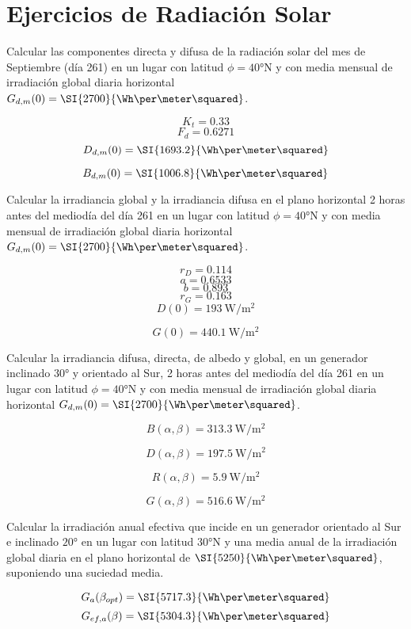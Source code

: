 \chapter{Ejercicios de Radiación Solar}



Calcular las componentes directa y difusa de la radiación solar del
mes de Septiembre (día 261) en un lugar con latitud $\phi=\ang{40}\mathrm{N}$
y con media mensual de irradiación global diaria horizontal $G_{d,m}(0)=\SI{2700}{\Wh\per\meter\squared}$.

\[
K_{t}=0.33\]
\[
F_{d}=0.6271\]
\[
D_{d,m}(0)=\SI{1693.2}{\Wh\per\meter\squared}\]


\[
B_{d,m}(0)=\SI{1006.8}{\Wh\per\meter\squared}\]


Calcular la irradiancia global y la irradiancia difusa en el plano
horizontal 2 horas antes del mediodía del día 261 en un lugar con
latitud $\phi=\ang{40}\mathrm{N}$ y con media mensual de irradiación
global diaria horizontal $G_{d,m}(0)=\SI{2700}{\Wh\per\meter\squared}$.

\[
r_{D}=0.114\]
\[
a=0.6533\]
\[
b=0.893\]
\[
r_{G}=0.163\]
\[
D(0)=\SI{193}{\watt\per\meter\squared}\]


\[
G(0)=\SI{440.1}{\watt\per\meter\squared}\]


Calcular la irradiancia difusa, directa, de albedo y global, en un
generador inclinado $\ang{30}$ y orientado al Sur, 2 horas antes
del mediodía del día 261 en un lugar con latitud $\phi=\ang{40}\mathrm{N}$
y con media mensual de irradiación global diaria horizontal $G_{d,m}(0)=\SI{2700}{\Wh\per\meter\squared}$.

\[
B(\alpha,\beta)=\SI{313.3}{\watt\per\meter\squared}\]


\[
D(\alpha,\beta)=\SI{197.5}{\watt\per\meter\squared}\]


\[
R(\alpha,\beta)=\SI{5.9}{\watt\per\meter\squared}\]


\[
G(\alpha,\beta)=\SI{516.6}{\watt\per\meter\squared}\]


Calcular la irradiación anual efectiva que incide en un generador
orientado al Sur e inclinado $\ang{20}$ en un lugar con latitud $\ang{30}\mathrm{N}$
y una media anual de la irradiación global diaria en el plano horizontal
de $\SI{5250}{\Wh\per\meter\squared}$, suponiendo una suciedad
media.

\[
G_{a}(\beta_{opt})=\SI{5717.3}{\Wh\per\meter\squared}\]
\[
G_{ef,a}(\beta)=\SI{5304.3}{\Wh\per\meter\squared}\]

